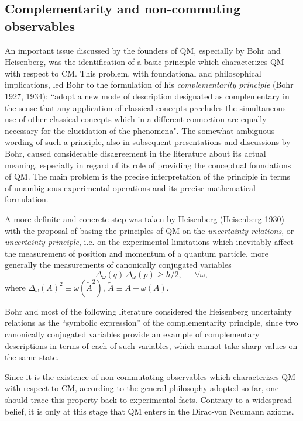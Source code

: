 \documentclass[12pt]{article}
\def \be {\begin{equation}}
\def \ee {\end{equation}}
\def \eqq {\equiv}
\def \om {{\omega}}
\begin{document}
 
\subsection{Complementarity  and non-commuting obser\-va\-bles}
\vspace{2mm}

An important issue discussed by  the founders of QM, especially by Bohr and Heisenberg, was 
the identification of  a basic principle which characterizes QM with respect to CM. 
This problem, with foundational and philosophical implications, led Bohr to the formulation of his {\em complementarity principle} (Bohr 1927, 1934): ``adopt a new mode of  description designated as complementary in the sense that any application of classical concepts precludes the simultaneous use of other classical concepts  which in a different connection are equally necessary for the elucidation of the phenomena". The somewhat ambiguous wording of such a principle, also in subsequent presentations and discussions by Bohr, caused considerable disagreement in the literature  about its actual meaning, especially  in regard of its role of providing the conceptual foundations  of QM. The main problem is the precise interpretation of the principle in terms of unambiguous experimental operations and its precise mathematical formulation. 

A more definite and concrete step was taken by  Heisenberg (Heisenberg 1930) with the proposal of basing the principles of QM on the {\em uncertainty relations}, or {\em  uncertainty principle}, i.e. on the experimental limitations which inevitably affect the measurement of position and momentum of a quantum particle, more generally the measurements of canonically conjugated variables
 \be{\Delta_\om(q)\,\Delta_\om(p) \geq \hbar/2, \,\,\,\,\,\,\,\,\,\forall \om,}\ee 
where $\Delta_\om(A)^2 \eqq \om(\tilde{A}^2)$, $ \tilde{A} \eqq A - \om(A)$.

 Bohr and  most of the following literature considered the Heisenberg uncertainty relations  as the ``symbolic expression'' of the complementarity principle, since two canonically conjugated  variables provide an example of complementary descriptions in terms of each of such variables,  which cannot take sharp values on the same state.

 Since it is the existence of non-commutating observables which characterizes QM with respect to CM, according to the general philosophy adopted so far, one should trace this property back to experimental facts. Contrary to a widespread belief, it is only at this stage that QM enters in the Dirac-von Neumann axioms.
\end{document}
